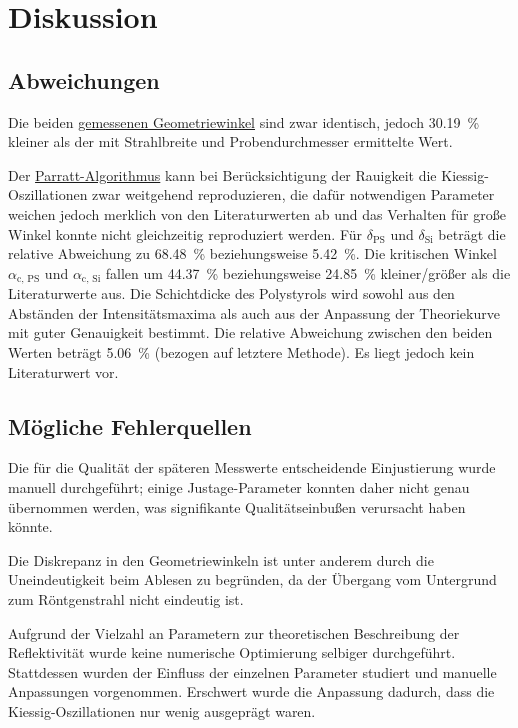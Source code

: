 \section{Diskussion}
\label{sec:diskussion}

\subsection{Abweichungen}
Die beiden \hyperref[sec:auswertung:rockingscan]{gemessenen Geometriewinkel} sind zwar identisch,
jedoch \SI{30.19}{\percent} kleiner als der mit Strahlbreite und Probendurchmesser ermittelte Wert.

Der \hyperref[sec:auswertung:schichtdicke]{Parratt-Algorithmus} kann bei Berücksichtigung der Rauigkeit
die Kiessig-Oszillationen zwar weitgehend reproduzieren,
die dafür notwendigen Parameter weichen jedoch merklich von den Literaturwerten ab
und das Verhalten für große Winkel konnte nicht gleichzeitig reproduziert werden.
Für $\delta_\text{PS}$ und $\delta_\text{Si}$ beträgt die relative Abweichung zu \cite{versuchsanleitung}
\SI{68.48}{\percent} beziehungsweise \SI{5.42}{\percent}.
Die kritischen Winkel $\alpha_\text{c, PS}$ und $\alpha_\text{c, Si}$
fallen um \SI{44.37}{\percent} beziehungsweise \SI{24.85}{\percent} kleiner/größer als die Literaturwerte \cite{versuchsanleitung} aus.
Die Schichtdicke des Polystyrols wird
    sowohl aus den Abständen der Intensitätsmaxima
    als auch aus der Anpassung der Theoriekurve
mit guter Genauigkeit bestimmt.
Die relative Abweichung zwischen den beiden Werten beträgt \SI{5.06}{\percent}
    (bezogen auf letztere Methode).
Es liegt jedoch kein Literaturwert vor.


\subsection{Mögliche Fehlerquellen}
Die für die Qualität der späteren Messwerte entscheidende Einjustierung
wurde manuell durchgeführt;
einige Justage-Parameter konnten daher nicht genau übernommen werden,
was signifikante Qualitätseinbußen verursacht haben könnte.

Die Diskrepanz in den Geometriewinkeln ist unter anderem durch die Uneindeutigkeit beim Ablesen zu begründen,
da der Übergang vom Untergrund zum Röntgenstrahl nicht eindeutig ist.

Aufgrund der Vielzahl an Parametern zur theoretischen Beschreibung der Reflektivität
wurde keine numerische Optimierung selbiger durchgeführt.
Stattdessen wurden der Einfluss der einzelnen Parameter studiert
und manuelle Anpassungen vorgenommen.
Erschwert wurde die Anpassung dadurch,
dass die Kiessig-Oszillationen nur wenig ausgeprägt waren.

